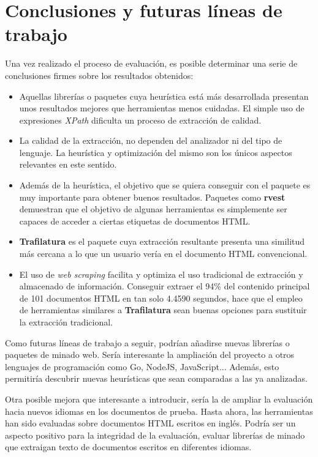 \chapter{Conclusiones y futuras líneas de trabajo}
\label{cha:conclusiones y futuras lineas de trabajo}

Una vez realizado el proceso de evaluación, es posible determinar una serie de conclusiones firmes sobre
los resultados obtenidos:

\begin{itemize}

    \item Aquellas librerías o paquetes cuya heurística está más desarrollada presentan unos resultados
    mejores que herramientas menos cuidadas. El simple uso de expresiones \emph{XPath} dificulta un proceso
    de extracción de calidad.
    \item La calidad de la extracción, no dependen del analizador ni del tipo de lenguaje. La heurística
    y optimización del mismo son los únicos aspectos relevantes en este sentido.
    \item Además de la heurística, el objetivo que se quiera conseguir con el paquete es muy importante 
    para obtener buenos resultados. Paquetes como \textbf{rvest} demuestran que el objetivo de algunas 
    herramientas es simplemente ser capaces de acceder a ciertas etiquetas de documentos HTML.
    \item \textbf{Trafilatura} es el paquete cuya extracción resultante presenta una similitud más cercana
    a lo que un usuario vería en el documento HTML convencional.
    \item El uso de \emph{web scraping} facilita y optimiza el uso tradicional de extracción y almacenado
    de información. Conseguir extraer el 94\% del contenido principal de 101 documentos HTML en tan solo 
    4.4590 segundos, hace que el empleo de herramientas similares a \textbf{Trafilatura} sean buenas 
    opciones para sustituir la extracción tradicional.

\end{itemize}

Como futuras líneas de trabajo a seguir, podrían añadirse nuevas librerías o paquetes de minado web. Sería
interesante la ampliación del proyecto a otros lenguajes de programación como Go, NodeJS, JavaScript...
Además, esto permitiría descubrir nuevas heurísticas que sean comparadas a las ya analizadas.

Otra posible mejora que interesante a introducir, sería la de ampliar la evaluación hacia nuevos idiomas 
en los documentos de prueba. Hasta ahora, las herramientas han sido evaluadas sobre documentos HTML escritos 
en inglés. Podría ser un aspecto positivo para la integridad de la evaluación, evaluar librerías de minado 
que extraigan texto de documentos escritos en diferentes idiomas.